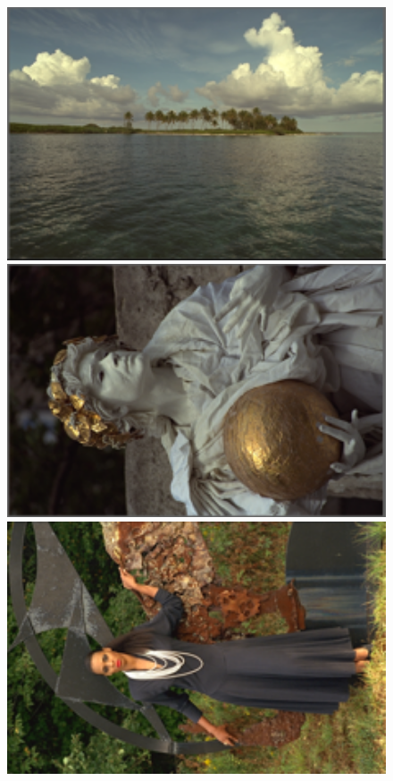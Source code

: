 \documentclass[10pt,twocolumn,letterpaper]{article}
\begin{document}
\begin{figure}
{\begin{minipage}{0.075\textwidth}
\end{minipage}
\begin{minipage}{0.075\textwidth}
\includegraphics[width=1\textwidth]{24images/resize_kodim16.png}
\end{minipage}
\begin{minipage}{0.075\textwidth}
\includegraphics[width=1\textwidth]{24images/resize_kodim17.png}
\end{minipage}
\begin{minipage}{0.075\textwidth}
\includegraphics[width=1\textwidth]{24images/resize_kodim18.png}

\end{minipage}}
\end{figure}
\end{document}
